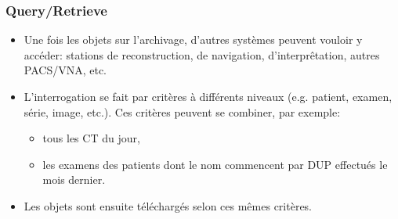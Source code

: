 	\frame
	{
		\frametitle{Query/Retrieve}
		\begin{itemize}
			\item Une fois les objets sur l'archivage, d'autres syst\`emes peuvent vouloir y acc\'eder: stations de reconstruction, de navigation, d'interpr\^etation, autres PACS/VNA, etc.
			\item<2-> L'interrogation se fait par crit\`eres \`a diff\'erents niveaux (e.g. patient, examen, s\'erie, image, etc.).
			Ces crit\`eres peuvent se combiner, par exemple:
			\begin{itemize}
				\item<3-> tous les CT du jour,
				\item<4-> les examens des patients dont le nom commencent par DUP effectu\'es le mois dernier.
			\end{itemize}
			\item<5-> Les objets sont ensuite t\'el\'echarg\'es selon ces m\^emes crit\`eres.
		\end{itemize}
	}
    